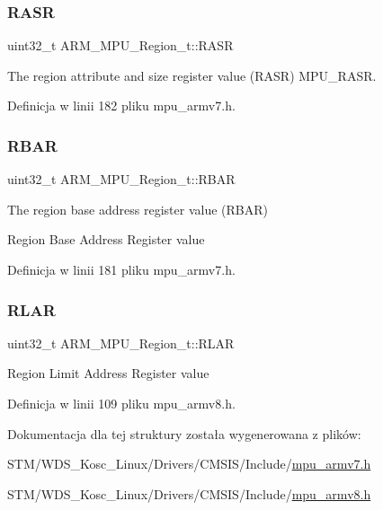 \subsubsection{\texorpdfstring{R\+A\+SR}{RASR}}
{\footnotesize\ttfamily uint32\+\_\+t A\+R\+M\+\_\+\+M\+P\+U\+\_\+\+Region\+\_\+t\+::\+R\+A\+SR}



The region attribute and size register value (R\+A\+SR) M\+P\+U\+\_\+\+R\+A\+SR. 



Definicja w linii 182 pliku mpu\+\_\+armv7.\+h.

\mbox{\label{struct_a_r_m___m_p_u___region__t_afe7a7721aa08988d915670efa432cdd2}} 
\subsubsection{\texorpdfstring{R\+B\+AR}{RBAR}}
{\footnotesize\ttfamily uint32\+\_\+t A\+R\+M\+\_\+\+M\+P\+U\+\_\+\+Region\+\_\+t\+::\+R\+B\+AR}



The region base address register value (R\+B\+AR) 

Region Base Address Register value 

Definicja w linii 181 pliku mpu\+\_\+armv7.\+h.

\mbox{\label{struct_a_r_m___m_p_u___region__t_ab5d3a650dbffd0b272bf7df5b140e8a8}} 
\subsubsection{\texorpdfstring{R\+L\+AR}{RLAR}}
{\footnotesize\ttfamily uint32\+\_\+t A\+R\+M\+\_\+\+M\+P\+U\+\_\+\+Region\+\_\+t\+::\+R\+L\+AR}

Region Limit Address Register value 

Definicja w linii 109 pliku mpu\+\_\+armv8.\+h.



Dokumentacja dla tej struktury została wygenerowana z plików\+:\begin{DoxyCompactItemize}
\item 
S\+T\+M/\+W\+D\+S\+\_\+\+Kosc\+\_\+\+Linux/\+Drivers/\+C\+M\+S\+I\+S/\+Include/\hyperlink{mpu__armv7_8h}{mpu\+\_\+armv7.\+h}\item 
S\+T\+M/\+W\+D\+S\+\_\+\+Kosc\+\_\+\+Linux/\+Drivers/\+C\+M\+S\+I\+S/\+Include/\hyperlink{mpu__armv8_8h}{mpu\+\_\+armv8.\+h}\end{DoxyCompactItemize}
